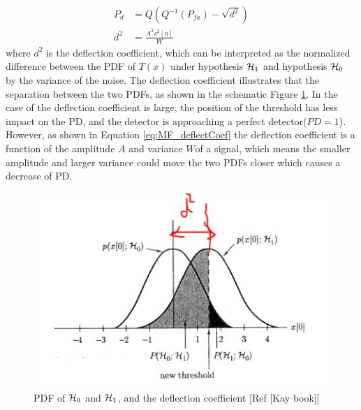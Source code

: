 \begin{align} \label{eq:MF_deflectCoef}
P_d &= Q(Q^{-1}(P_{fa})-\sqrt{d^2})\\    
d^2 &= \frac{A^2s^2[n]}{W}
\end{align}
where $d^2$ is the deflection coefficient, which can be interpreted as the normalized difference between the PDF of $T(x)$ under hypothesis $\operatorname*{\mathcal{H}_1}$ and hypothesis $\operatorname*{\mathcal{H}_0}$ by the variance of the noise. The deflection coefficient illustrates that the separation between the two PDFs, as shown in the schematic Figure \ref{fig:dsquare}. In the case of the deflection coefficient is large, the position of the threshold has less impact on the PD, and the detector is approaching a perfect detector($PD = 1$). However, as shown in Equation \eqref{eq:MF_deflectCoef} the deflection coefficient is a function of the amplitude $A$ and variance $W$of a signal, which means the smaller amplitude and larger variance could move the two PDFs closer which causes a decrease of PD.
\begin{figure}[t!p]
\centering
\includegraphics[width=.8\textwidth]{figures/chapter6_ADC/dsquare.jpg}
\caption{PDF of $\operatorname*{\mathcal{H}_0}$ and $\operatorname*{\mathcal{H}_1}$, and the deflection coefficient [Ref [Kay book]]}
\label{fig:dsquare}
\end{figure}
